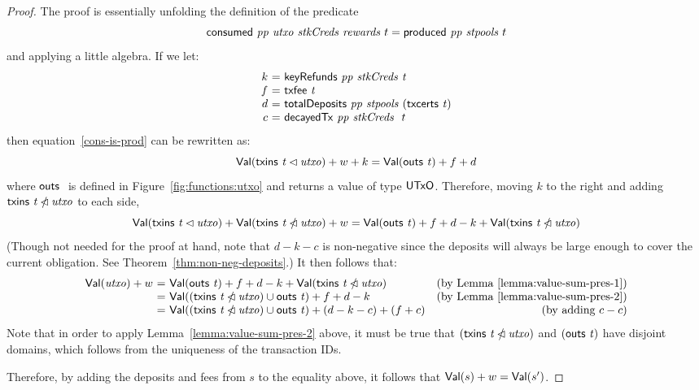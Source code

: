 \begin{proof}
  The proof is essentially unfolding the definition of the predicate
  \begin{equation}
    \label{cons-is-prod}
    \mathsf{consumed}~ \mathit{pp}~ \mathit{utxo}~ \mathit{stkCreds}~ \mathit{rewards}~{t} = \mathsf{produced}~ \mathit{pp}~ \mathit{stpools}~{t}
  \end{equation}
  and applying a little algebra.
%
If we let:
  \begin{equation*}
    \begin{array}{r@{~=~}l}
      k & \keyRefunds{pp}{stkCreds}{t} \\
      f & \txfee{t} \\
      d & \totalDeposits{pp}{stpools}{(\txcerts{t})} \\
      c & \decayedTx{pp}{stkCreds}~{t} \\
    \end{array}
  \end{equation*}
  then equation~\ref{cons-is-prod} can be rewritten as:
  \begin{equation*}
    \mathsf{Val}(\mathsf{txins}~ \mathit{t} \lhd{\ensuremath{\mathit{utxo}}}) + w + k = \mathsf{Val}(\mathsf{outs}~ \mathit{t}) + f + d
  \end{equation*}
  where $\mathsf{outs}~ \mathit{}$ is defined in Figure~\ref{fig:functions:utxo} and returns a value of type $\mathsf{UTxO}$.
  Therefore, moving $k$ to the right and adding $\mathsf{txins}~ \mathit{t} \mathbin{\slashed{\lhd}}{\mathit{utxo}}$ to each side,
  \begin{equation*}
    \mathsf{Val}(\mathsf{txins}~ \mathit{t} \lhd{\ensuremath{\mathit{utxo}}}) + \mathsf{Val}(\mathsf{txins}~ \mathit{t} \mathbin{\slashed{\lhd}}{\mathit{utxo}}) + w
    = \mathsf{Val}(\mathsf{outs}~ \mathit{t}) + f + d - k + \mathsf{Val}(\mathsf{txins}~ \mathit{t} \mathbin{\slashed{\lhd}}{\mathit{utxo}})
  \end{equation*}
  (Though not needed for the proof at hand,
  note that $d-k-c$ is non-negative since the deposits will always be large enough to cover
  the current obligation. See Theorem~\ref{thm:non-neg-deposits}.)
%
  It then follows that:
  \begin{equation*}
    \begin{array}{r@{~=~}lr}
      \Val(\var{utxo}) + w
    & \Val(\outs{t}) + f + d - k + \Val(\txins{t} \subtractdom{\var{utxo}})
    & \text{(by Lemma~\ref{lemma:value-sum-pres-1})}
    \\
    & \Val((\txins{t} \subtractdom{\var{utxo}})\cup\outs{t}) + f + d - k
    & \text{(by Lemma~\ref{lemma:value-sum-pres-2})}
    \\
    & \Val((\txins{t} \subtractdom{\var{utxo}})\cup\outs{t}) + (d-k-c) + (f+c)
    & \text{(by adding $c-c$)}
    \end{array}
  \end{equation*}
  Note that in order to apply Lemma~\ref{lemma:value-sum-pres-2} above,
  it must be true that $(\mathsf{txins}~ \mathit{t} \mathbin{\slashed{\lhd}}{\mathit{utxo}})$ and $(\mathsf{outs}~ \mathit{t})$
  have disjoint domains, which follows from the uniqueness of the transaction IDs.

  Therefore, by adding the deposits and fees from $s$ to the equality above,
  it follows that $\mathsf{Val}(s) + w = \mathsf{Val}(s')$.
\end{proof}

